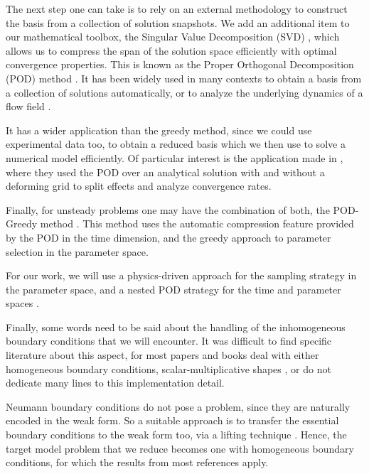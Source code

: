 The next step one can take is to rely on an external methodology
to construct the basis from a collection of solution snapshots.
We add an additional item to our mathematical toolbox,
the Singular Value Decomposition (SVD)
\cite{2000_POD_as_SVD},
which allows us to compress the span of the solution space
efficiently with optimal convergence properties.
This is known as the Proper Orthogonal Decomposition (POD) method
\cite{Aubry1991}.
It has been widely used in many contexts 
to obtain a basis from a collection of solutions automatically,
or to analyze the underlying dynamics of a flow field \cite{1987_turbulenceDynamicsCoherentStructures_Sirovich}.

It has a wider application than the greedy method,
since we could use experimental data too, 
to obtain a reduced basis which we then use to solve a numerical model efficiently.
Of particular interest is the application made in
\cite{2003_podBasedReducedOrderModelsWithDeformingGrids_anttonen},
where they used the POD over an analytical solution 
with and without a deforming grid to split effects and analyze convergence rates.

Finally, for unsteady problems one may have the combination of both, 
the \mbox{POD-Greedy} method
\cite{Haasdonk2008, 
Haasdonk2013}.
This method uses the automatic compression feature provided by the POD in the time dimension,
and the greedy approach to parameter selection in the parameter space.

For our work, we will use a physics-driven approach for the sampling strategy in the parameter space,
and a nested POD strategy for the time and parameter spaces \cite{Santo_Manzoni_2019}.

Finally, some words need to be said about the handling of 
the inhomogeneous boundary conditions that we will encounter.
It was difficult to find specific literature about this aspect,
for most papers and books deal with either homogeneous boundary conditions, 
scalar-multiplicative shapes 
\cite{separableBoundaryCondition,
separableBoundaryCondition_Two},
or do not dedicate many lines to this implementation detail.

Neumann boundary conditions do not pose a problem, 
since they are naturally encoded in the weak form.
So a suitable approach is to transfer the essential boundary conditions to the weak form too,
via a lifting technique
\cite{2007_ReducedOrderModelingTimeDependentPDEsMultipleParametersBoundaryData_gunzburger}.
Hence, the target model problem that we reduce 
becomes one with homogeneous boundary conditions,
for which the results from most references apply.


